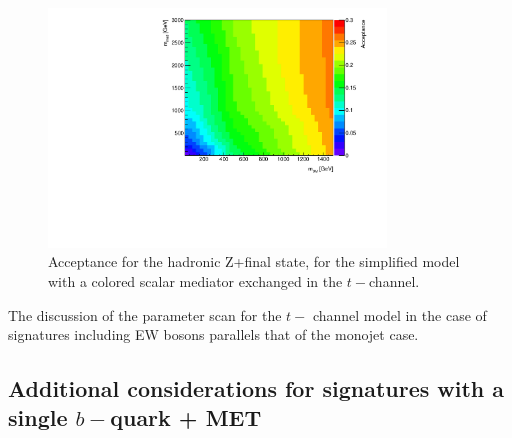 \begin{figure}[h!]
	\centering  
	\includegraphics[width=0.8\textwidth]{figures/EW/monoZhad_TChannel/TChan_newplot.pdf}
	\caption{Acceptance for the hadronic Z+\MET final state,
		for the simplified model with a colored scalar mediator exchanged in the $t-$channel.}
	\label{fig:TChan_EW_Zhad_acc}
\end{figure}

The discussion of the parameter scan for the $t-$ channel model
in the case of signatures including EW bosons
parallels that of the monojet case. 


%
%

 \subsection{\texorpdfstring{Additional considerations for signatures with a single $b-$quark + MET}{Additional considerations for  with a single b-quark + MET}}
 \label{sec:singleb}
 
